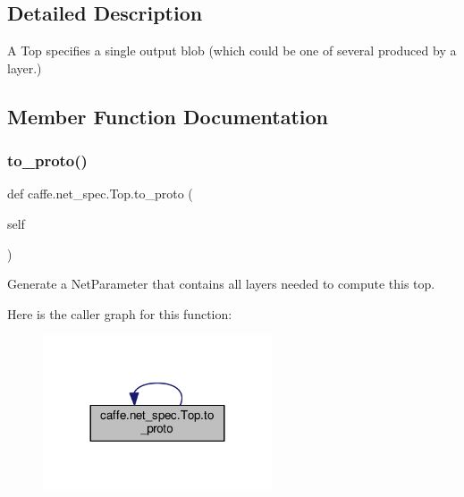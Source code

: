 \subsection{Detailed Description}
\begin{DoxyVerb}A Top specifies a single output blob (which could be one of several
produced by a layer.)\end{DoxyVerb}
 

\subsection{Member Function Documentation}
\mbox{\label{classcaffe_1_1net__spec_1_1_top_a90b516f1772cd633670ec8c06118ad49}} 
\subsubsection{\texorpdfstring{to\+\_\+proto()}{to\_proto()}\hspace{0.1cm}{\footnotesize\ttfamily [1/2]}}
{\footnotesize\ttfamily def caffe.\+net\+\_\+spec.\+Top.\+to\+\_\+proto (\begin{DoxyParamCaption}\item[{}]{self }\end{DoxyParamCaption})}

\begin{DoxyVerb}Generate a NetParameter that contains all layers needed to compute
this top.\end{DoxyVerb}
 Here is the caller graph for this function\+:
\nopagebreak
\begin{figure}[H]
\begin{center}
\leavevmode
\includegraphics[width=192pt]{classcaffe_1_1net__spec_1_1_top_a90b516f1772cd633670ec8c06118ad49_icgraph}
\end{center}
\end{figure}
\mbox{\label{classcaffe_1_1net__spec_1_1_top_a90b516f1772cd633670ec8c06118ad49}} 
